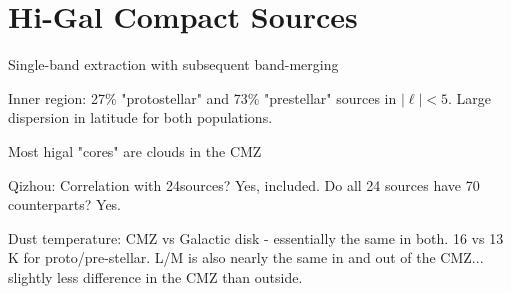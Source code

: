 \section{Hi-Gal Compact Sources}

Single-band extraction with subsequent band-merging

Inner region: 27\% "protostellar" and 73\% "prestellar" sources in $|\ell|<5$.
Large dispersion in latitude for both populations.

Most higal "cores" are clouds in the CMZ

Qizhou: Correlation with 24\um sources?  Yes, included.  Do all 24 \um sources have 70 \um counterparts?  Yes.

Dust temperature: CMZ vs Galactic disk -  essentially the same in both.  16 vs 13 K for proto/pre-stellar.  L/M is also nearly the same in and out of the CMZ... slightly less difference in the CMZ than outside.